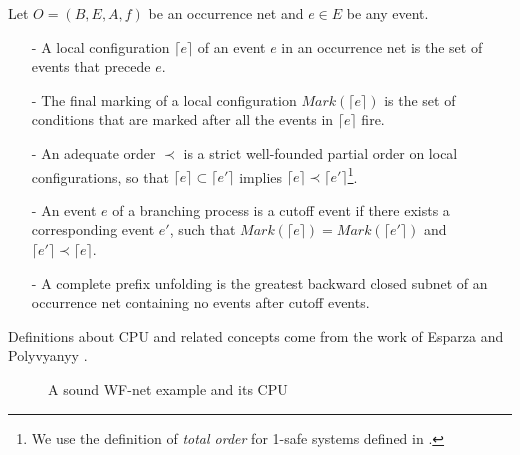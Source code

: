 \documentclass{llncs}
\begin{document}
\begin{definition}\label{def:cpu}
Let $O=(B,E,A,f)$ be an occurrence net and $e\in E$ be any event.
	\begin{itemize}
		\item[-] A local configuration $\lceil e\rceil$ of an event $e$ in an occurrence net is the set of events that precede $e$.
		\item[-] The final marking of a local configuration $Mark(\lceil e\rceil)$ is the set of conditions that are marked after all the events in $\lceil e\rceil$ fire.
		\item[-] An adequate order $\prec$ is a strict well-founded partial order on local configurations, so that $\lceil e\rceil\subset\lceil e'\rceil$ implies $\lceil e\rceil\prec\lceil e'\rceil$\footnote{We use the definition of \emph{total order} for 1-safe systems defined in \cite{esparza2002improvement}.}.
		\item[-] An event $e$ of a branching process is a cutoff event if there exists a corresponding event $e'$, such that $Mark(\lceil e\rceil)=Mark(\lceil e'\rceil)$ and $\lceil e'\rceil\prec\lceil e\rceil$.
		\item[-] A complete prefix unfolding is the greatest backward closed subnet of an occurrence net containing no events after cutoff events.
	\end{itemize}
\end{definition}

Definitions about CPU and related concepts come from the work of Esparza \cite{esparza2002improvement} and Polyvyanyy \cite{polyvyanyy2010structuring}.

\begin{figure}[htbp]
\centering
{}
\caption{A sound WF-net example and its CPU\label{fig:examplePetriAndCpu}}
\end{figure}
\end{document}
